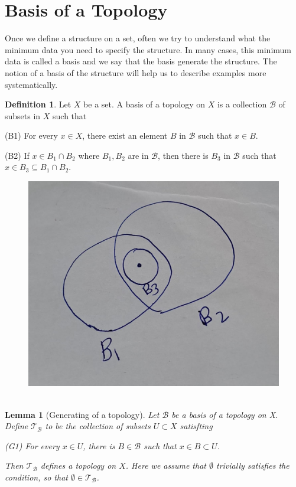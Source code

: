 \documentclass[
]{book}
\newtheorem{lemma}{Lemma}[chapter]
\theoremstyle{definition}
\newtheorem{definition}{Definition}[chapter]
\theoremstyle{definition}
\theoremstyle{definition}
\theoremstyle{definition}
\theoremstyle{remark}
\begin{document}
\hypertarget{basis-of-a-topology}{%
\section{Basis of a Topology}\label{basis-of-a-topology}}

Once we define a structure on a set, often we try to understand what the minimum data you need to specify the structure. In many cases, this minimum data is called a basis and we say that the basis generate the structure. The notion of a basis of the structure will help us to describe examples more systematically.

\begin{definition}
\protect\hypertarget{def:unnamed-chunk-8}{}\label{def:unnamed-chunk-8}Let \(X\) be a set. A basis of a topology on \(X\) is a collection \(\mathcal{B}\) of subsets in \(X\) such that

(B1) For every \(x \in X\), there exist an element \(B\) in \(\mathcal{B}\) such that \(x \in B\).

(B2) If \(x \in B_{1} \cap B_{2}\) where \(B_{1}, B_{2}\) are in \(\mathcal{B}\), then there is \(B_{3}\) in \(\mathcal{B}\) such that \(x \in B_{3} \subseteq B_{1} \cap B_{2}\).
\end{definition}

\begin{figure}
\centering
\includegraphics{figures/figure 03.jpg}
\caption{\label{fig:fig3}\(~\)}
\end{figure}

\begin{lemma}[Generating of a topology]
\protect\hypertarget{lem:unnamed-chunk-9}{}\label{lem:unnamed-chunk-9}Let \(\mathcal{B}\) be a basis of a topology on X. Define \(\mathcal{T}_{\mathcal{B}}\) to be the collection of subsets \(U \subset X\) satisfting

(G1) For every \(x \in U\), there is \(B \in \mathcal{B}\) such that \(x \in B \subset U\).

Then \(\mathcal{T}_{\mathcal{B}}\) defines a topology on \(X\). Here we assume that \(\emptyset\) trivially satisfies the condition, so that \(\emptyset \in \mathcal{T}_{\mathcal{B}}\).
\end{lemma}
\end{document}
